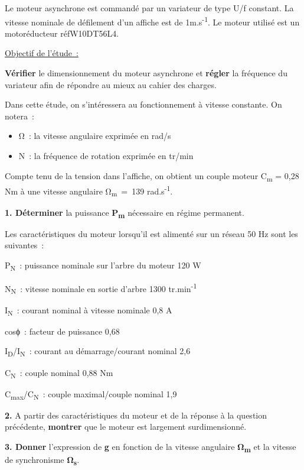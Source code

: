 Le moteur asynchrone est commandé par un variateur de type U/f constant. La vitesse nominale de défilement d'un affiche est de 1m.s\textsuperscript{-1}. Le moteur utilisé est un motoréducteur réfW10DT56L4.

\ul{Objectif de l'étude~:}

\textbf{Vérifier} le dimensionnement du moteur asynchrone et \textbf{régler} la fréquence du variateur afin de répondre au mieux au cahier des charges.

Dans cette étude, on s'intéressera au fonctionnement à vitesse constante. On notera~:

\begin{itemize}
\item
  Ω~: la vitesse angulaire exprimée en rad/s
\item
  N~: la fréquence de rotation exprimée en tr/min
\end{itemize}

Compte tenu de la tension dans l'affiche, on obtient un couple moteur C\textsubscript{m} = 0,28 Nm à une vitesse angulaire Ω\textsubscript{m}~=~139 rad.s\textsuperscript{-1}.

\textbf{1. Déterminer} la puissance \textbf{P\textsubscript{m}} nécessaire en régime permanent.

Les caractéristiques du moteur lorsqu'il est alimenté sur un réseau 50 Hz sont les suivantes~:

P\textsubscript{N}~: puissance nominale sur l'arbre du moteur 120 W

N\textsubscript{N}~: vitesse nominale en sortie d'arbre 1300 tr.min\textsuperscript{-1}

I\textsubscript{N}~: courant nominal à vitesse nominale 0,8 A

cosϕ~: facteur de puissance 0,68

I\textsubscript{D}/I\textsubscript{N}~: courant au démarrage/courant nominal 2,6

C\textsubscript{N}~: couple nominal 0,88 Nm

C\textsubscript{max}/C\textsubscript{N}~: couple maximal/couple nominal 1,9

\textbf{2.} A partir des caractéristiques du moteur et de la réponse à la question précédente, \textbf{montrer} que le moteur est largement surdimensionné.

\textbf{3. Donner} l'expression de \textbf{g} en fonction de la vitesse angulaire \textbf{Ω\textsubscript{m}} et la vitesse de synchronisme \textbf{Ω\textsubscript{s}}.

